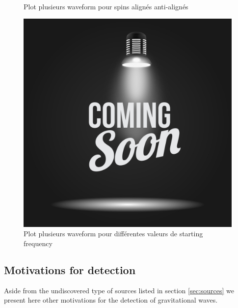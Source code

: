 \begin{figure}
\begin{minipage}{0.45\linewidth}
    \caption{Plot plusieurs waveform pour spins alignés anti-alignés}
    \label{fig:waveform_spinAlign}
  \end{minipage}
  \hfill
  \begin{minipage}{0.45\linewidth}
    \includegraphics[width=\linewidth]{placeholder.png}
    \caption{Plot plusieurs waveform pour différentes valeurs de starting frequency}
    \label{fig:waveform_startFreq}
  \end{minipage}
  \hfill
\end{figure}



\subsection{Motivations for detection}
\label{sec:motivations}
Aside from the undiscovered type of sources listed in section \ref{sec:sources} we present here other motivations for the detection of gravitational waves.

